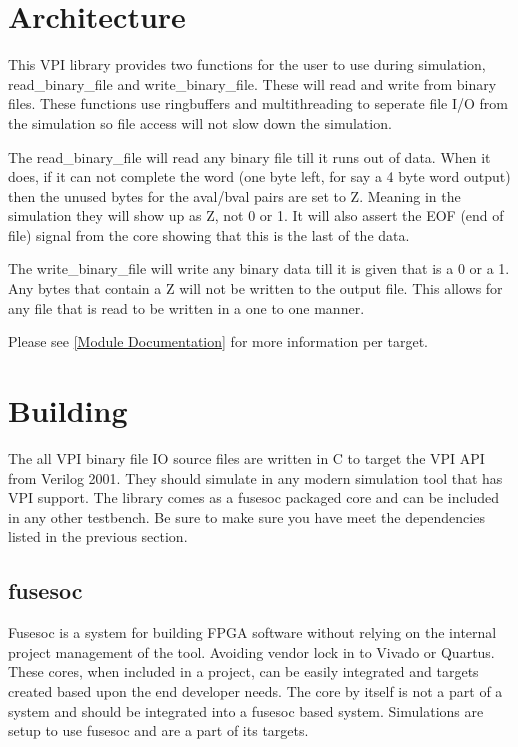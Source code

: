 \section{Architecture}
\par
This VPI library provides two functions for the user to use during simulation, read\_binary\_file and write\_binary\_file. These will read and
write from binary files. These functions use ringbuffers and multithreading to seperate file I/O from the simulation so file access will not
slow down the simulation.
\par
The read\_binary\_file will read any binary file till it runs out of data. When it does, if it can not complete the word (one byte left, for say a 4 byte word output)
then the unused bytes for the aval/bval pairs are set to Z. Meaning in the simulation they will show up as Z, not 0 or 1. It will also assert the EOF (end of file) signal
from the core showing that this is the last of the data.
\par
The write\_binary\_file will write any binary data till it is given that is a 0 or a 1. Any bytes that contain a Z will not be written to the output file. This allows for
any file that is read to be written in a one to one manner.

Please see \ref{Module Documentation} for more information per target.

\section{Building}

\par
The all VPI binary file IO source files are written in C to target the VPI API from Verilog 2001. They should simulate in any modern simulation tool that has VPI support.
The library comes as a fusesoc packaged core and can be included in any other testbench. Be sure to make sure you have meet the dependencies listed in the previous section.

\subsection{fusesoc}
\par
Fusesoc is a system for building FPGA software without relying on the internal project management of the tool. Avoiding vendor lock in to Vivado or Quartus.
These cores, when included in a project, can be easily integrated and targets created based upon the end developer needs. The core by itself is not a part of
a system and should be integrated into a fusesoc based system. Simulations are setup to use fusesoc and are a part of its targets.

